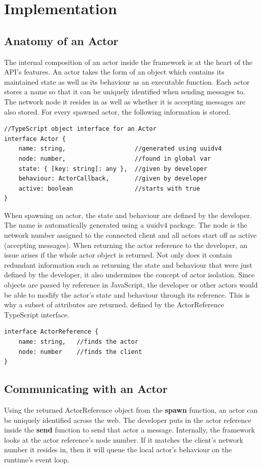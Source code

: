 \documentclass[12pt, a4paper]{report}
\theoremstyle{definition}
\theoremstyle{definition}%
\theoremstyle{definition}%
\theoremstyle{definition}%
\theoremstyle{definition}%
\theoremstyle{definition}%
\begin{document}
\section{Implementation}
\subsection{Anatomy of an Actor}
The internal composition of an actor inside the framework is at the heart of the API's features. An actor takes the form of an object which contains its maintained state as well as its behaviour as an executable function. Each actor stores a name so that it can be uniquely identified when sending messages to. The network node it resides in as well as whether it is accepting messages are also stored. For every spawned actor, the following information is stored.
\begin{lstlisting}
//TypeScript object interface for an Actor
interface Actor {
    name: string,                   //generated using uuidv4
    node: number,                   //found in global var
    state: { [key: string]: any },  //given by developer
    behaviour: ActorCallback,       //given by developer
    active: boolean                 //starts with true
}
\end{lstlisting}
When spawning an actor, the state and behaviour are defined by the developer. The name is automatically generated using a uuidv4 package. The node is the network number assigned to the connected client and all actors start off as active (accepting messages). When returning the actor reference to the developer, an issue arises if the whole actor object is returned. Not only does it contain redundant information such as returning the state and behaviour that were just defined by the developer, it also undermines the concept of actor isolation. Since objects are passed by reference in JavaScript, the developer or other actors would be able to modify the actor's state and behaviour through its reference. This is why a subset of attributes are returned, defined by the ActorReference TypeScript interface.
\begin{lstlisting}
interface ActorReference {
    name: string,   //finds the actor
    node: number    //finds the client
}
\end{lstlisting}
\subsection{Communicating with an Actor}
Using the returned ActorReference object from the \textbf{spawn} function, an actor can be uniquely identified across the web. The developer puts in the actor reference inside the \textbf{send} function to send that actor a message. Internally, the framework looks at the actor reference's node number. If it matches the client's network number it resides in, then it will queue the local actor's behaviour on the runtime's event loop. 
\end{document}
